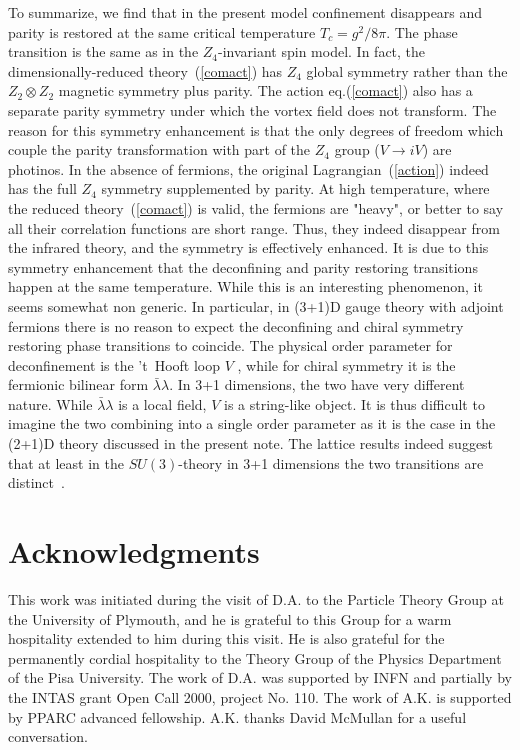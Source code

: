 \documentclass[a4paper,12pt]{article}
\begin{document}
To summarize, we find that in the present model confinement
disappears and parity is restored at the same critical temperature
$T_c=g^2/8\pi$. The phase transition is the same as in the
$Z_4$-invariant spin model. In fact, the dimensionally-reduced
theory~(\ref{comact}) has $Z_4$ global symmetry rather than the
$Z_2\otimes Z_2$ magnetic symmetry plus parity. The action
eq.(\ref{comact}) also has a separate parity symmetry under which
the vortex field does not transform. The reason for this symmetry
enhancement is that the only degrees of freedom which couple the
parity transformation with part of the $Z_4$ group ($V\rightarrow
iV$) are photinos. In the absence of fermions, the original
Lagrangian~(\ref{action}) indeed has the full $Z_4$ symmetry
supplemented by parity. At high temperature, where the reduced
theory~(\ref{comact}) is valid, the fermions are "heavy", or
better to say all their correlation functions are short range.
Thus, they indeed disappear from the infrared theory, and the
symmetry is effectively enhanced. It is due to this symmetry
enhancement that the deconfining and parity restoring transitions
happen at the same temperature. While this is an interesting
phenomenon, it seems somewhat non generic. In particular, in
(3+1)D gauge theory with adjoint fermions there is no reason to
expect the deconfining and chiral symmetry restoring phase
transitions to coincide. The physical order parameter for
deconfinement is the 't~Hooft loop $V$ \cite{thooftloop}, while
for chiral symmetry it is the fermionic bilinear form
$\bar\lambda\lambda$. In 3+1 dimensions, the two have very
different nature. While $\bar\lambda\lambda$ is a local field, $V$
is a string-like object. It is thus difficult to imagine the two
combining into a single order parameter as it is the case in the
(2+1)D theory discussed in the present note. The lattice results
indeed suggest that at least in the $SU(3)$-theory in 3+1
dimensions the two transitions are distinct~\cite{adjoint}.

\section*{Acknowledgments}
This work was initiated during the visit of D.A. to the
Particle Theory Group at the University of Plymouth, and he is grateful to this Group
for a warm hospitality extended to him during this visit. He is also grateful for the permanently cordial hospitality
to the Theory Group of the Physics Department of the Pisa University.
The work of D.A. was supported by INFN and partially by the
INTAS grant Open Call 2000, project No. 110.
The work of
A.K. is supported by PPARC advanced fellowship. A.K. thanks David
McMullan for a useful conversation.
\end{document}
